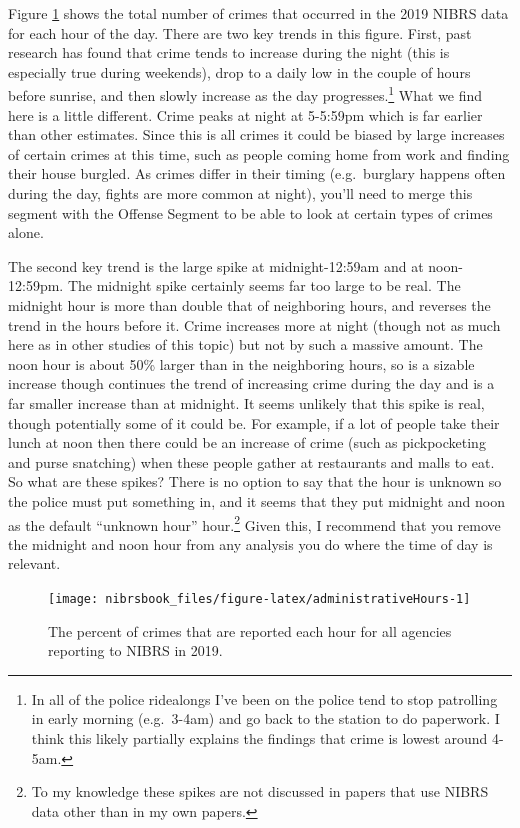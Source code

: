 \documentclass[
  12pt,
  openany]{book}
\begin{document}
Figure \ref{fig:administrativeHours} shows the total number of crimes that occurred in the 2019 NIBRS data for each hour of the day. There are two key trends in this figure. First, past research has found that crime tends to increase during the night (this is especially true during weekends), drop to a daily low in the couple of hours before sunrise, and then slowly increase as the day progresses.\footnote{In all of the police ridealongs I've been on the police tend to stop patrolling in early morning (e.g.~3-4am) and go back to the station to do paperwork. I think this likely partially explains the findings that crime is lowest around 4-5am.} What we find here is a little different. Crime peaks at night at 5-5:59pm which is far earlier than other estimates. Since this is all crimes it could be biased by large increases of certain crimes at this time, such as people coming home from work and finding their house burgled. As crimes differ in their timing (e.g.~burglary happens often during the day, fights are more common at night), you'll need to merge this segment with the Offense Segment to be able to look at certain types of crimes alone.

The second key trend is the large spike at midnight-12:59am and at noon-12:59pm. The midnight spike certainly seems far too large to be real. The midnight hour is more than double that of neighboring hours, and reverses the trend in the hours before it. Crime increases more at night (though not as much here as in other studies of this topic) but not by such a massive amount. The noon hour is about 50\% larger than in the neighboring hours, so is a sizable increase though continues the trend of increasing crime during the day and is a far smaller increase than at midnight. It seems unlikely that this spike is real, though potentially some of it could be. For example, if a lot of people take their lunch at noon then there could be an increase of crime (such as pickpocketing and purse snatching) when these people gather at restaurants and malls to eat. So what are these spikes? There is no option to say that the hour is unknown so the police must put something in, and it seems that they put midnight and noon as the default ``unknown hour'' hour.\footnote{To my knowledge these spikes are not discussed in papers that use NIBRS data other than in my own papers.} Given this, I recommend that you remove the midnight and noon hour from any analysis you do where the time of day is relevant.

\begin{figure}

{\centering \texttt{[image: nibrsbook\_files/figure-latex/administrativeHours-1]} 

}

\caption{The percent of crimes that are reported each hour for all agencies reporting to NIBRS in 2019.}\label{fig:administrativeHours}
\end{figure}
\end{document}
